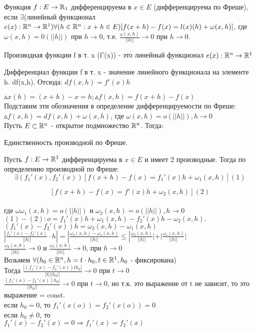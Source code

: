 \begin{opred}
Функция $f:E\to\mathbb{R}_1$ дифференцируема в $x\in E$ (дифференцируема по Фреше), если $\exists$(линейный функционал 
\\$e(x):\mathbb{R}^n\to\mathbb{R}^1)\forall(h\in\mathbb{R}^n:x+h\in E)[f(x+h)-f(x)=l(x)(h)+\omega(x,h)]$, где $\omega(x,h)=0 (||h||)$ при $h\to 0$, т.е. $\frac{\omega (x,h)}{||h||}\to 0$ при $h\to 0$.
\end{opred}

\begin{opred}
	Производная функции f в т. x (f'(x)) - это линейный функционал $e(x):\mathbb{R}^n \to \mathbb{R}^1$ 
\end{opred}

\begin{opred}
	Дифференциал функции f в т. x - значение линейного функционала на элементе h. df(x,h). Отсюда:
	$df(x,h)=f'(x)h$
\end{opred}

$\vartriangle x(h)=(x+h)-x=h; \vartriangle f(x,h) = f(x+h)-f(x)$
\\
Подставим эти обозначения в определение дифференцируемости по Фреше:
\\
$\vartriangle f(x,h) = df(x,h) + \omega (x,h)$, где $\omega (x,h) = o(||h||), h\to 0$
\\
Пусть $E \subset \mathbb{R}^n$ - открытое подмножество $\mathbb{R}^n$. Тогда: 
\begin{teorema}
Единственность производной по Фреше.
\end{teorema}

\dokvo
Пусть $f:E\to\mathbb{R}^1$ дифференцируема в $x\in E$ и  имеет 2 производные. Тогда по определению производной по Фреше:
$$
\exists (f_1'(x),f_2'(x))[f(x+h)-f(x)=f_1'(x)h+\omega_1 (x,h)] (1)
$$

$$
[f(x+h)-f(x)=f'(x)h+\omega_2 (x,h)] (2)
$$
\\
где $\omega\omega_1(x,h)=o(||h||)$ и $\omega_2(x,h)=o(||h||), h\to 0$
\\
$(1)-(2):o=f_1'(x)h+\omega_1(x,h)-f_2'(x)h-\omega_2 (x,h).$
\\
$(f_1'(x)-f_2'(x))h=\omega_2(x,h)-\omega_1(x,h)$
\\
$|\frac{f_1'(x)-f_2'(x)}{||h||}\cdot h|=|\frac{\omega_2(x,h)-\omega_1(x,h)}{||h||}\le|\frac{\omega_2(x,h)}{||h||}|+|\frac{\omega_1(x,h)}{||h||}|$
\\
$\frac{\omega_2(x,h)}{||h||} \to 0$ и $\frac{\omega_1(x,h)}{||h||} \to 0$, при $h\to 0$
\\
Возьмем $\forall (h_0\in\mathbb{R}^n, h=t\cdot h_0, t\in\mathbb{R}^1, h_0$ - фиксирована) 
\\
Тогда $\frac{|(f_1'(x)-f_2'(x))t h_0|}{|t|||h_0||}\to 0$ при $t\to 0$
\\
$\frac{(f_1'(x)-f_2'(x))h_0|}{||h_0||}\to 0$ при $t\to 0$, но т.к. это выражение от t не зависит, то это выражение = const.
\\
если $h_0 = 0$, то $f_1'(x(o))=f_2'(x(o))=0$
\\
если $h_0 \neq 0$, то 
\\
$f_1'(x)-f_2'(x)=0\Rightarrow f_1'(x)=f_2'(x)$
\\
\dokno

